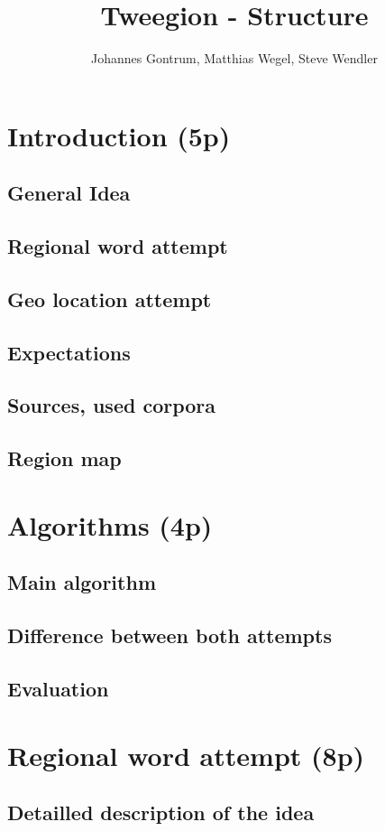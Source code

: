 \documentclass[
	11pt,
	notitlepage,
	oneside
]{scrartcl}
\title{Tweegion - Structure}
\author{Johannes Gontrum, Matthias Wegel, Steve Wendler}
\begin{document}
\tableofcontents

\section{Introduction (5p)}
\subsection{General Idea}
\subsection{Regional word attempt}
\subsection{Geo location attempt}
\subsection{Expectations}
\subsection{Sources, used corpora}
\subsection{Region map}

\section{Algorithms (4p)}
\subsection{Main algorithm}
\subsection{Difference between both attempts}
\subsection{Evaluation}

\section{Regional word attempt (8p)}
\subsection{Detailled description of the idea}
\end{document}
